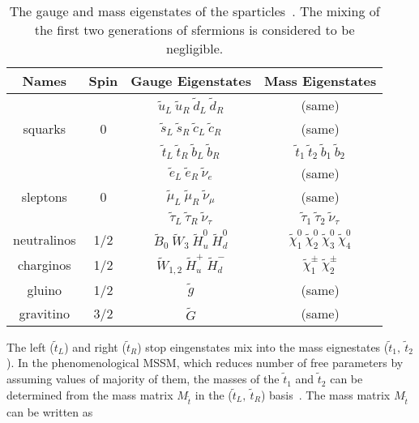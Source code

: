 \begin{table}[h]
\begin{center}
\begin{tabular}{|c|c|c|c|}
\hline
Names & Spin  & Gauge Eigenstates & Mass Eigenstates  \\
\hline
      \rule{0pt}{3ex}   &   & $\tilde{u}_{L}~\tilde{u}_{R}~\tilde{d}_{L}~\tilde{d}_{R}$  & (same) \\
squarks & 0 & $\tilde{s}_{L}~\tilde{s}_{R}~\tilde{c}_{L}~\tilde{c}_{R}$  & (same) \\
        &   & $\tilde{t}_{L}~\tilde{t}_{R}~\tilde{b}_{L}~\tilde{b}_{R}$  & $\tilde{t}_{1}~\tilde{t}_{2}~\tilde{b}_{1}~\tilde{b}_{2}$ \\
\hline
         &   & $\tilde{e}_{L}~\tilde{e}_{R}~\tilde{\nu}_{e}$  & (same) \\
sleptons & 0 & $\tilde{\mu}_{L}~\tilde{\mu}_{R}~\tilde{\nu}_{\mu}$  & (same) \\
         &   & $\tilde{\tau}_{L}~\tilde{\tau}_{R}~\tilde{\nu}_{\tau}$  & $\tilde{\tau}_{1}~\tilde{\tau}_{2}~\tilde{\nu}_{\tau}$ \\
\hline
neutralinos \rule{0pt}{3ex} & 1/2 & $\tilde{B}_{0}~\tilde{W}_{3}~\tilde{H}_{u}^{0}~\tilde{H}_{d}^{0}$  & $\tilde{\chi}_{1}^{0}~\tilde{\chi}_{2}^{0}~\tilde{\chi}_{3}^{0}~\tilde{\chi}_{4}^{0} $ \\
\hline
charginos  \rule{0pt}{3ex} & 1/2 & $\tilde{W}_{1,2}~\tilde{H}_{u}^{+}~\tilde{H}_{d}^{-}$  & $\tilde{\chi}_{1}^{\pm}~\tilde{\chi}_{2}^{\pm} $ \\
\hline 
gluino & 1/2 & $\tilde{g}$  & (same) \\
\hline
gravitino  \rule{0pt}{3ex} & 3/2 & $\tilde{G}$  & (same) \\
\hline
\end{tabular}
\caption[Table caption text]{The gauge and mass eigenstates of the sparticles~\cite{Martin:1997ns}. The mixing of the first two generations of sfermions is considered to be negligible. }
\label{tab:SUSYspectrum}
\end{center}
\end{table}

The left ($\tilde{t}_{L}$) and right ($\tilde{t}_{R}$) stop eingenstates mix into the mass eignestates ($\tilde{t}_{1},~\tilde{t}_{2}$). In the phenomenological MSSM, which reduces number of free parameters by assuming values of majority of them, the masses of the $\tilde{t}_{1}$ and $\tilde{t}_{2}$ can be determined from the mass matrix $M_{\tilde{t}}$ in the ($\tilde{t}_{L},~\tilde{t}_{R}$) basis~\cite{Passehr:2017ufr}. The mass matrix $M_{\tilde{t}}$ can be written as

